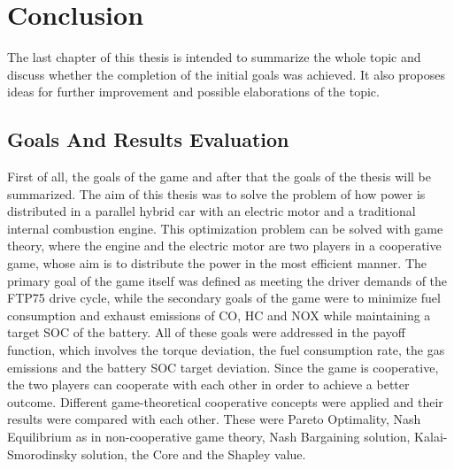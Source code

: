 \chapter{Conclusion}
\label{chp:conclusion}

The last chapter of this thesis is intended to summarize the whole topic and discuss whether the completion of the initial goals was achieved. It also proposes ideas for further improvement and possible elaborations of the topic.

\section{Goals And Results Evaluation}
First of all, the goals of the game and after that the goals of the thesis will be summarized. The aim of this thesis was to solve the problem of how power is distributed in a parallel hybrid car with an electric motor and a traditional internal combustion engine. This optimization problem can be solved with game theory, where the engine and the electric motor are two players in a cooperative game, whose aim is to distribute the power in the most efficient manner. The primary goal of the game itself was defined as meeting the driver demands of the FTP75 drive cycle, while the secondary goals of the game were to minimize fuel consumption and exhaust emissions of CO, HC and NOX while maintaining a target SOC of the battery. All of these goals were addressed in the payoff function, which involves the torque deviation, the fuel consumption rate, the gas emissions and the battery SOC target deviation. Since the game is cooperative, the two players can cooperate with each other in order to achieve a better outcome. Different game-theoretical cooperative concepts were applied and their results were compared with each other. These were Pareto Optimality, Nash Equilibrium as in non-cooperative game theory, Nash Bargaining solution, Kalai-Smorodinsky solution, the Core and the Shapley value. 


